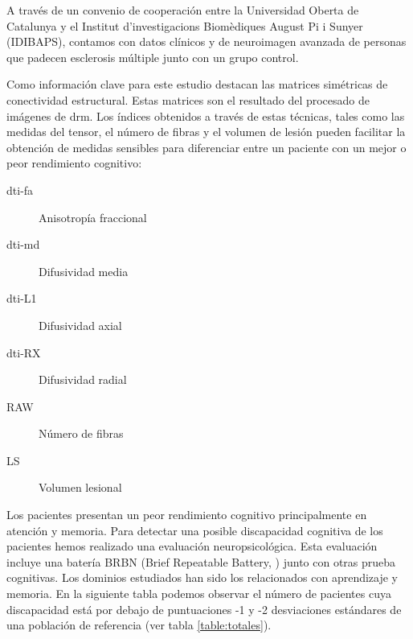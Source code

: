 A través de un convenio de cooperación entre la Universidad Oberta de Catalunya y el Institut d'investigacions Biomèdiques August Pi i Sunyer (IDIBAPS), contamos con datos clínicos y de neuroimagen avanzada de personas que padecen esclerosis múltiple junto con un grupo control.

Como información clave para este estudio destacan las matrices simétricas de conectividad estructural. Estas matrices son el resultado del procesado de imágenes de \gls{drm}. Los índices obtenidos a través de estas técnicas, tales como las medidas del tensor, el número de fibras y el volumen de lesión pueden facilitar la obtención de medidas sensibles para diferenciar entre un paciente con un mejor o peor rendimiento cognitivo:

\begin{description}
 \item [\gls{dti}-\gls{fa}] Anisotropía fraccional
 \item [\gls{dti}-\gls{md}] Difusividad media
 \item [\gls{dti}-L1] Difusividad axial
 \item [\gls{dti}-RX] Difusividad radial
 \item [RAW] Número de fibras
 \item [LS] Volumen lesional
\end{description}

Los pacientes presentan un peor rendimiento cognitivo principalmente en atención y memoria. Para detectar una posible discapacidad cognitiva de los pacientes hemos realizado una evaluación neuropsicológica. Esta evaluación incluye una batería BRBN (Brief Repeatable Battery,  \cite{Boringa2001ThePractice}) junto con otras prueba cognitivas. Los dominios estudiados han sido los relacionados con aprendizaje y memoria. En la siguiente tabla podemos observar el número de pacientes cuya discapacidad está por debajo de puntuaciones -1 y -2 desviaciones estándares de una población de referencia (ver tabla \ref{table:totales}).

